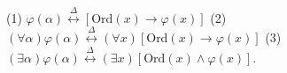 (1) $\varphi(\alpha) \overset{\Delta}{\leftrightarrow} [\text{Ord}(x) \rightarrow \varphi(x)]$
(2) $(\forall \alpha) \varphi(\alpha) \overset{\Delta}{\leftrightarrow} (\forall x)[\text{Ord}(x) \rightarrow \varphi(x)]$
(3) $(\exists \alpha) \varphi(\alpha) \overset{\Delta}{\leftrightarrow} (\exists x)[\text{Ord}(x) \wedge \varphi(x)]$.
